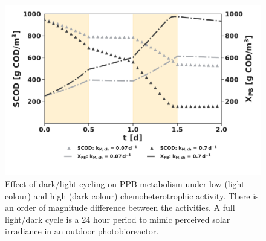 \begin{figure}[tp]
    \centering
    \includegraphics[width=1\linewidth]{./Chap2/simulations/ch2_kmch.pdf}
    \caption{Effect of dark/light cycling on PPB metabolism under low (light colour) and high (dark colour) chemoheterotrophic activity. There is an order of magnitude difference between the activities. A full light/dark cycle is a 24 hour period to mimic perceived solar irradiance in an outdoor photobioreactor.}
    \label{fig:ch2_kmch}
\end{figure}

